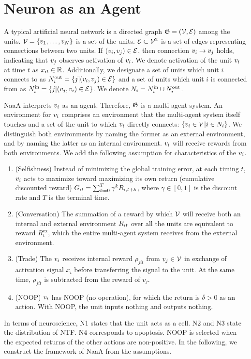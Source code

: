 \section{Neuron as an Agent}

A typical artificial neural network is a directed graph $\mathfrak{G} = (\mathcal{V}, \mathcal{E})$ among the units.
$\mathcal{V} = \{v_{1}, \dots, v_{N}\}$ is a set of the units. $\mathcal{E} \subset \mathcal{V}^2$ is a set of edges representing connections between two units.
If $(v_{i}, v_{j}) \in \mathcal{E}$, then connection $v_{i} \rightarrow v_{j}$ holds, indicating that $v_{j}$ observes activation of $v_{i}$.
We denote activation of the unit $v_{i}$ at time $t$ as $x_{it} \in \mathbb{R}$.
Additionally, we designate a set of units which unit $i$ connects to as $N^\mathrm{out}_i = \{j | (v_{i}, v_{j}) \in \mathcal{E} \}$ and a set of units which unit $i$ is connected from as $N^\mathrm{in}_i = \{j | (v_{j}, v_{i}) \in \mathcal{E} \}$.
We denote $N_i = N^\mathrm{in}_i \cup N^\mathrm{out}_i$.

NaaA interprets $v_{i}$ as an agent.
Therefore, $\mathfrak{G}$ is a multi-agent system.
An environment for $v_{i}$ comprises an environment that the multi-agent system itself touches and a 
set of the unit to which $v_{i}$ directly connects: $\{v_i \in V | i \in N_i\}$.
We distinguish both environments by naming the former as an external environment, and by naming the latter as an internal environment.
$v_{i}$ will receive rewards from both environments.
We add the following assumption for characteristics of the $v_{i}$.
\begin{enumerate}
\renewcommand{\labelenumi}{N\arabic{enumi}:}
\item (Selfishness) 
	Instead of minimizing the global training error,
	at each timing $t$, $v_{i}$ acts to maximize toward maximizing its own return (cumulative discounted reward)
	$G_{it} = \sum_{k=0}^T \gamma^k R_{i,t+k}$, where $\gamma \in [0, 1]$ is the discount rate and $T$ is the terminal time.
\item (Conversation) 
	The summation of a reward by which $\mathcal{V}$ will receive both an internal and external environment $R_{it}$ over 
	all the units are equivalent to reward $R_t^{\mathrm{ex}}$, which the entire multi-agent system receives from 
	the external environment.
\item (Trade) 
	The $v_{i}$ receives internal reward $\rho_{jit}$ from $v_{j} \in \mathcal{V}$ in exchange of activation signal $x_i$
	before transferring the signal to the unit. At the same time, $\rho_{jit}$ is subtracted from the reward of $v_j$.
\item (NOOP) 
	$v_{i}$ has NOOP (no operation), for which the return is $\delta > 0$ as an action.
	With NOOP, the unit inputs nothing and outputs nothing.
\end{enumerate}
In terms of neuroscience,
N1 states that the unit acts as a cell.
N2 and N3 state the distribution of NTF. N4 corresponds to apoptosis.
NOOP is selected when the expected returns of the other actions are non-positive.
In the following, we construct the framework of NaaA from the assumptions.


